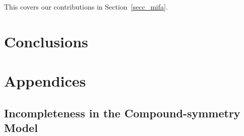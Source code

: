\documentclass[11pt,a5paper,twoside]{book}
\begin{document}
This covers our contributions in Section~\ref{secc_mifa}.

\chapter{Conclusions}


\chapter{Appendices}

\backmatter

\appendix
\setcounter{equation}{0}
\renewcommand{\theequation}{A.\arabic{equation}}
\renewcommand{\thesection}{A.\arabic{section}}



\section{Incompleteness in the Compound-symmetry Model} \label{appA}
\end{document}

